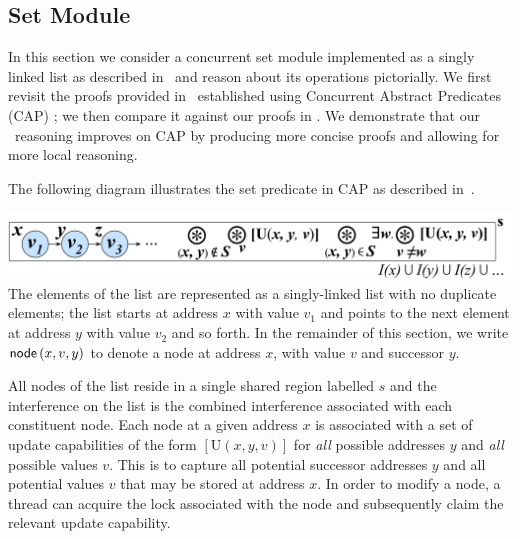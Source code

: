 \subsection{Set Module}\label{subsec:set}
In this section we consider a concurrent set module implemented as a singly linked list as described in~\cite{cap-ecoop10} and reason about its operations pictorially. We first revisit the proofs provided in~\cite{cap-ecoop10} established using Concurrent Abstract Predicates (CAP) ; we then compare it against our proofs in \colosl. We demonstrate that our \colosl\ reasoning improves on CAP by producing  more concise proofs and allowing for more local reasoning. 

The following diagram illustrates the set predicate in CAP as described in~\cite{cap-ecoop10}.

%
{\centering \includegraphics[scale=0.232]{Sections/Examples/Images/capSet.pdf}\\}
%
%
The elements of the list are represented as a singly-linked list with no duplicate elements; the list starts at address $x$ with value $v_1$ and points to the next element at address $y$ with value $v_2$ and so forth. In the remainder of this section, we write $\textsf{node}\left(x, v, y\right)$ to denote a node at address $x$, with value $v$ and successor $y$. 

All nodes of the list reside in a single shared region labelled $s$ and the interference on the list is the combined interference associated with each constituent node. 
Each node at a given address $x$ is associated with a set of update capabilities of the form $[\text{U}(x, y, v)]$ for \emph{all} possible addresses $y$ and \emph{all} possible values $v$. This is to capture all potential successor addresses $y$ and all potential values $v$ that may be stored at address $x$. 
In order to modify a node, a thread can acquire the lock associated with the node and subsequently claim the relevant update capability.
% 

